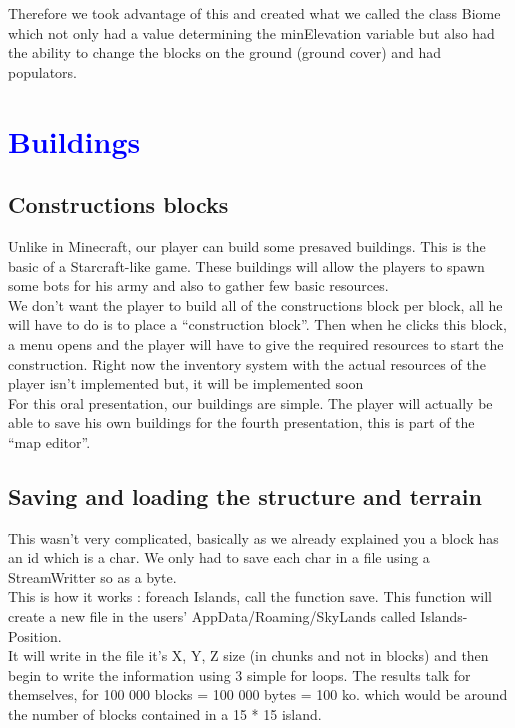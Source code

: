\documentclass[article]{report}             %
\begin{document}
				Therefore we took advantage of this and created what we called the class Biome which not only had a value determining the minElevation variable but also had the ability to change the blocks on the ground (ground cover) and had populators.


		\chapter{\textcolor{blue}{Buildings}}
			\section{Constructions blocks}
				Unlike in Minecraft, our player can build some presaved buildings. This is the basic of a Starcraft-like game. These buildings will allow the players to spawn some bots for his army and also to gather few basic resources.\\

We don't want the player to build all of the constructions block per block, all he will have to do is to place a \enquote{construction block}. Then when he clicks this block, a menu opens and the player will have to give the required resources to start the construction. Right now the inventory system with the actual resources of the player isn't implemented but, it will be implemented soon\\

For this oral presentation, our buildings are simple. The player will actually be able to save his own buildings for the fourth presentation, this is part of the \enquote{map editor}.
			
			\section{Saving and loading the structure and terrain}
				This wasn't very complicated, basically as we already explained you a block has an id which is a char. We only had to save each char in a file using a StreamWritter so as a byte.\\
				This is how it works : foreach Islands, call the function save. This function will create a new file in the users' AppData/Roaming/SkyLands called Islands-Position.\\

				It will write in the file it's X, Y, Z size (in chunks and not in blocks) and then begin to write the information using 3 simple for loops.
				The results talk for themselves, for 100 000 blocks = 100 000 bytes = 100 ko. which would be around the number of blocks contained in a 15 * 15 island.
				
\end{document}
